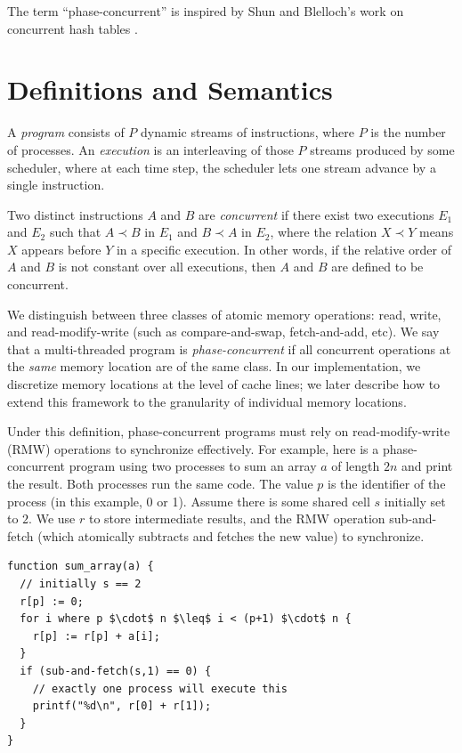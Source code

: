 \documentclass{article}
\begin{document}
The term ``phase-concurrent'' is inspired by Shun and Blelloch's work on concurrent hash tables \cite{shun2014phase}.

\section{Definitions and Semantics}

A \textit{program} consists of $P$ dynamic streams of instructions, where $P$ is the number of processes. An \textit{execution} is an interleaving of those $P$ streams produced by some scheduler, where at each time step, the scheduler lets one stream advance by a single instruction.

Two distinct instructions $A$ and $B$ are \textit{concurrent} if there exist two executions $E_1$ and $E_2$ such that $A \prec B$ in $E_1$ and $B \prec A$ in $E_2$, where the relation $X \prec Y$ means $X$ appears before $Y$ in a specific execution. In other words, if the relative order of $A$ and $B$ is not constant over all executions, then $A$ and $B$ are defined to be concurrent.

We distinguish between three classes of atomic memory operations: read, write, and read-modify-write (such as compare-and-swap, fetch-and-add, etc). We say that a multi-threaded program is \textit{phase-concurrent} if all concurrent operations at the \textit{same} memory location are of the same class. In our implementation, we discretize memory locations at the level of cache lines; we later describe how to extend this framework to the granularity of individual memory locations.

Under this definition, phase-concurrent programs must rely on read-modify-write (RMW) operations to synchronize effectively. For example, here is a phase-concurrent program using two processes to sum an array $a$ of length $2n$ and print the result. Both processes run the same code. The value $p$ is the identifier of the process (in this example, 0 or 1). Assume there is some shared cell $s$ initially set to $2$. We use $r$ to store intermediate results, and the RMW operation sub-and-fetch (which atomically subtracts and fetches the new value) to synchronize.

\begin{lstlisting}
function sum_array(a) {
  // initially s == 2
  r[p] := 0;
  for i where p $\cdot$ n $\leq$ i < (p+1) $\cdot$ n {
    r[p] := r[p] + a[i];
  }
  if (sub-and-fetch(s,1) == 0) {
    // exactly one process will execute this
    printf("%d\n", r[0] + r[1]);
  }
}
\end{lstlisting}
\end{document}

